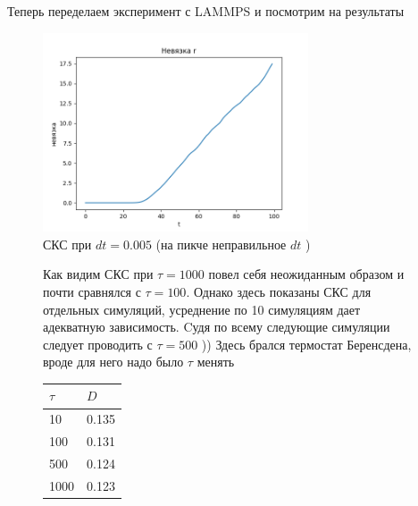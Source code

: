 \documentclass[a4paper]{article}
\begin{document}
Теперь переделаем эксперимент с LAMMPS и посмотрим на результаты
\begin{figure}[h]
\begin{center}
\includegraphics[width=0.7\textwidth]{rdiv.png}
\caption{СКС при $dt = 0.005$  (на пикче неправильное $dt$ )}
\end{center}
\end{figure}




\begin{figure}[H]
\begin{center}
\begin{minipage}[h]{0.65\linewidth}
Как видим СКС при $\tau = 1000$ повел себя неожиданным образом и почти сравнялся с $\tau = 100$. Однако здесь показаны СКС для отдельных симуляций, усреднение по 10 симуляциям дает адекватную зависимость. Cудя по всему следующие симуляции следует проводить с $\tau = 500$ )) Здесь брался термостат Беренсдена, вроде для него надо было $\tau$  менять
\end{minipage}
\hfill
\begin{minipage}[h]{0.25\linewidth}
 \vspace{-2ex}
\begin{table}[H]
\begin{tabular}{l|l}
$\tau$  & $D$     \\ \hline
10   & 0.135 \\ 
100  & 0.131 \\ 
500  & 0.124 \\ 
1000 & 0.123 \\ 
\end{tabular}
\end{table}
\end{minipage}
\end{center}
\end{figure}
\end{document}
